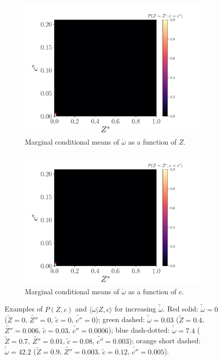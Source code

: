 \documentclass[review]{elsarticle}
\newcommand{\wt}[1]{\widetilde{#1}}
\begin{document}
\begin{figure}[!tbp]
  \begin{subfigure}[t]{0.48\textwidth}%
    \includegraphics[page=11,width=\textwidth, trim=0.5cm 0cm 1.5cm 1.1cm, clip=true]{./figs/pdfs_dice_0004.pdf}%
    \caption{Marginal conditional means of $\dot{\omega}$ as a function of $Z$.}%
  \end{subfigure}\hfill%
  \begin{subfigure}[t]{0.48\textwidth}%
    \includegraphics[page=12,width=\textwidth, trim=0.5cm 0cm 1.5cm 1.1cm, clip=true]{./figs/pdfs_dice_0004.pdf}%
    \caption{Marginal conditional means of $\dot{\omega}$ as a function of $c$.}%
  \end{subfigure}%
  \caption{Examples of $P(Z,c)$ and $\langle \dot{\omega} | Z, c \rangle$ for increasing $\wt{\dot{\omega}}$. Red solid: $\wt{\dot{\omega}} = 0$ ($\wt{Z} = 0$, $\wt{Z''} = 0$, $\wt{c} = 0$, $\wt{c''} = 0$); green dashed: $\wt{\dot{\omega}} = 0.03$ ($\wt{Z}  =0.4$, $\wt{Z''}=0.006$, $\wt{c}  =0.03$, $\wt{c''}=0.0006$); blue dash-dotted: $\wt{\dot{\omega}} = 7.4$ ($\wt{Z}  =0.7$, $\wt{Z''}=0.01$, $\wt{c}  =0.08$, $\wt{c''}=0.003$); orange short dashed: $\wt{\dot{\omega}} = 42.2$ ($\wt{Z}  =0.9$, $\wt{Z''}=0.003$, $\wt{c}  =0.12$, $\wt{c''}=0.005$).}\label{fig:pdfs}%
\end{figure}%
\end{document}
